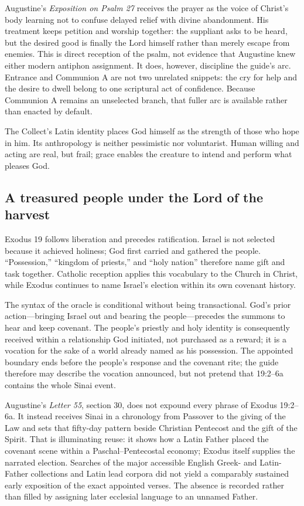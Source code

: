 \begin{deepstudy}
Augustine's \emph{Exposition on Psalm 27} receives the prayer as the voice of Christ's body learning not to confuse delayed relief with divine abandonment. His treatment keeps petition and worship together: the suppliant asks to be heard, but the desired good is finally the Lord himself rather than merely escape from enemies. This is direct reception of the psalm, not evidence that Augustine knew either modern antiphon assignment. It does, however, discipline the guide's arc. Entrance and Communion A are not two unrelated snippets: the cry for help and the desire to dwell belong to one scriptural act of confidence. Because Communion A remains an unselected branch, that fuller arc is available rather than enacted by default.

The Collect's Latin identity places God himself as the strength of those who hope in him. Its anthropology is neither pessimistic nor voluntarist. Human willing and acting are real, but frail; grace enables the creature to intend and perform what pleases God.

\subsection*{A treasured people under the Lord of the harvest\enspace{}}

Exodus 19 follows liberation and precedes ratification. Israel is not selected because it achieved holiness; God first carried and gathered the people. “Possession,” “kingdom of priests,” and “holy nation” therefore name gift and task together. Catholic reception applies this vocabulary to the Church in Christ, while Exodus continues to name Israel's election within its own covenant history.

The syntax of the oracle is conditional without being transactional. God's prior action---bringing Israel out and bearing the people---precedes the summons to hear and keep covenant. The people's priestly and holy identity is consequently received within a relationship God initiated, not purchased as a reward; it is a vocation for the sake of a world already named as his possession. The appointed boundary ends before the people's response and the covenant rite; the guide therefore may describe the vocation announced, but not pretend that 19:2--6a contains the whole Sinai event.

Augustine's \emph{Letter 55}, section 30, does not expound every phrase of Exodus 19:2--6a. It instead receives Sinai in a chronology from Passover to the giving of the Law and sets that fifty-day pattern beside Christian Pentecost and the gift of the Spirit. That is illuminating reuse: it shows how a Latin Father placed the covenant scene within a Paschal--Pentecostal economy; Exodus itself supplies the narrated election. Searches of the major accessible English Greek- and Latin-Father collections and Latin lead corpora did not yield a comparably sustained early exposition of the exact appointed verses. The absence is recorded rather than filled by assigning later ecclesial language to an unnamed Father.


\end{deepstudy}
